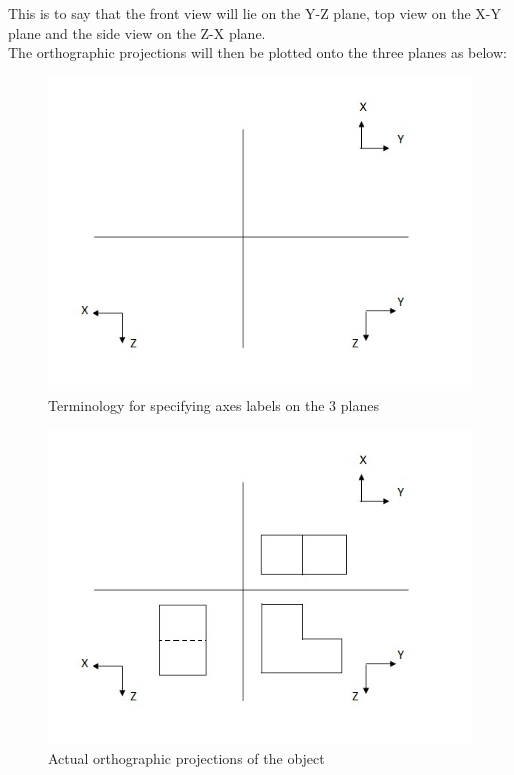 \documentclass[a4paper,11pt,openany]{book}
\begin{document}
\indent This is to say that the front view will lie on the Y-Z plane, top view on the X-Y plane and the side view on the Z-X plane. \\
\indent The orthographic projections will then be plotted onto the three planes as below:

\begin{figure}[h]
\centering
\includegraphics[scale=0.5]{2dLabels}
\caption{Terminology for specifying axes labels on the 3 planes}
\end{figure}

\begin{figure}[h]
\centering
\includegraphics[scale=0.6]{2d}
\caption{Actual orthographic projections of the object}
\end{figure}
\end{document}
